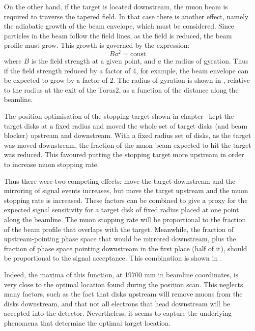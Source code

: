 On the other hand, if the target is located downstream, the muon beam is required to traverse the tapered field.
In that case there is another effect, namely the adiabatic growth of the beam envelope, which must be considered.
Since particles in the beam follow the field lines, as the field is reduced, the beam profile must grow.
This growth is governed by the expression:
\begin{equation}
Ba^2=\textrm{const}
\end{equation}
where $B$ is the field strength at a given point, and $a$ the radius of gyration. 
Thus if the field strength reduced by a factor of 4, for example, the beam envelope can be expected to grow by a factor of 2.
The radius of gyration is shown in , relative to the radius at the exit of the Torus2, as a function of the distance along the beamline.

The position optimisation of the stopping target shown in chapter~ kept the target disks at a fixed radius and moved the whole set of target disks (and beam blocker) upstream and downstream.
With a fixed radius set of disks, as the target was moved downstream, the fraction of the muon beam expected to hit the target was reduced.
This favoured putting the stopping target more upstream in order to increase muon stopping rate.

Thus there were two competing effects: move the target downstream and the mirroring of signal events increases, but move the target upstream and the muon stopping rate is increased.
These factors can be combined to give a proxy for the expected signal sensitivity for a target disk of fixed radius placed at one point along the beamline.
The muon stopping rate will be proportional to the fraction of the beam profile that overlaps with the target.
Meanwhile, the fraction of upstream-pointing phase space that would be mirrored downstream, plus the fraction of phase space pointing downstream in the first place (half of it), should be proportional to the signal acceptance.
This combination is shown in .

Indeed, the maxima of this function, at 19700 mm in beamline coordinates, is very close to the optimal location found during the position scan.
This neglects many factors, such as the fact that disks upstream will remove muons from the disks downstream, and that not all electrons that head downstream will be accepted into the detector.
Nevertheless, it seems to capture the underlying phenomena that determine the optimal target location.

